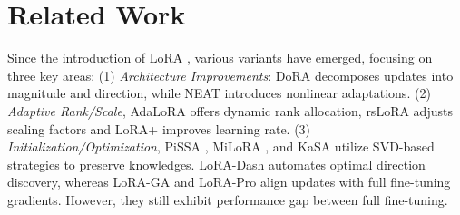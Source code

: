 \vspace{-2mm}
\section{Related Work}

Since the introduction of LoRA \cite{hulora}, various variants have emerged, focusing on three key areas:
(1) \textit{Architecture Improvements}: DoRA \cite{liudora} decomposes updates into magnitude and direction, while NEAT \cite{zhong2024neatnonlinearparameterefficientadaptation} introduces nonlinear adaptations.
(2) \textit{Adaptive Rank/Scale}, AdaLoRA \cite{zhangadaptive} offers dynamic rank allocation, rsLoRA \cite{kalajdzievski2023rankstabilizationscalingfactor} adjusts scaling factors and LoRA+ \cite{hayou2024loraefficientlowrank} improves learning rate.
(3) \textit{Initialization/Optimization}, PiSSA \cite{meng2024pissa}, MiLoRA \cite{wang2024miloraharnessingminorsingular}, and KaSA \cite{wang2024kasaknowledgeawaresingularvalueadaptation} utilize SVD-based strategies to preserve knowledges. LoRA-Dash \cite{si2024unleashingpowertaskspecificdirections} automates optimal direction discovery, whereas LoRA-GA \cite{wanglora} and LoRA-Pro \cite{wang2024loraprolowrankadaptersproperly} align updates with full fine-tuning gradients. However, they still exhibit performance gap between full fine-tuning. 

